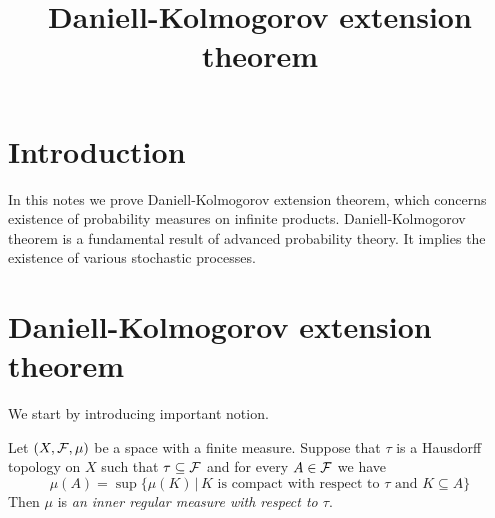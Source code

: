 



\title{Daniell-Kolmogorov extension theorem}
\date{}
\maketitle

\section{Introduction}
\noindent
In this notes we prove Daniell-Kolmogorov extension theorem, which concerns existence of probability measures on infinite products. Daniell-Kolmogorov theorem is a fundamental result of advanced probability theory. It implies the existence of various stochastic processes.

\section{Daniell-Kolmogorov extension theorem}
\noindent
We start by introducing important notion.

\begin{definition}
Let $(X,{\mathcal F},\mu)$ be a space with a finite measure. Suppose that $\tau$ is a Hausdorff topology on $X$ such that $\tau \subseteq {\mathcal F}$ and for every $A\in {\mathcal F}$ we have
$$\mu(A) = \sup \big\{\mu(K)\,\big|\,K\mbox{ is compact with respect to $\tau$ and }K\subseteq A\big\}$$
Then $\mu$ is \textit{an inner regular measure with respect to $\tau$}.
\end{definition}

